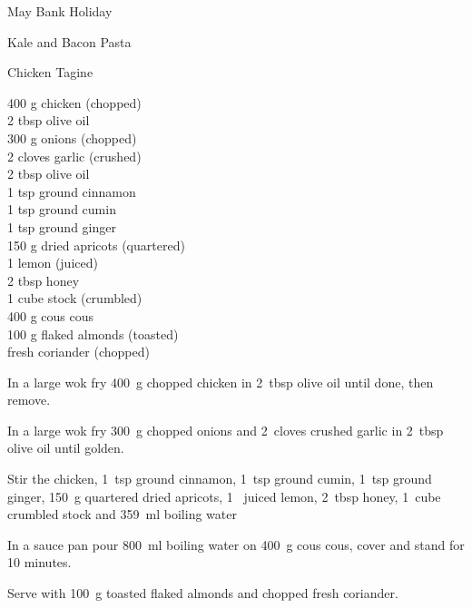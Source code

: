 \begin{menu}{May Bank Holiday}
\begin{recipe}{2}{Kale and Bacon Pasta}
\begin{instructions}
    \end{instructions}
    \end{recipe}%
  
    \begin{recipe}{2}{Chicken Tagine}%
    
		\begin{ingredients}
		400 g chicken (chopped) \\
	2 tbsp olive oil  \\
	300 g onions (chopped) \\
	2 cloves garlic (crushed) \\
	2 tbsp olive oil  \\
	1 tsp ground cinnamon  \\
	1 tsp ground cumin  \\
	1 tsp ground ginger  \\
	150 g dried apricots (quartered) \\
	1  lemon (juiced) \\
	2 tbsp honey  \\
	1 cube stock (crumbled) \\
	400 g cous cous  \\
	100 g flaked almonds (toasted) \\
	  fresh coriander (chopped) \\
	
		\end{ingredients}
	
    \begin{instructions}
    \item 
        In a large wok fry
        400~g chopped chicken
        in
        2~tbsp  olive oil
        until done, then remove.
      \item 
        In a large wok fry
        300~g chopped onions
        and
        2~cloves crushed garlic
        in
        2~tbsp  olive oil
        until golden.
      \item 
        Stir the chicken,
        1~tsp  ground cinnamon,
        1~tsp  ground cumin,
        1~tsp  ground ginger,
        150~g quartered dried apricots,
        1~ juiced lemon,
        2~tbsp  honey,
        1~cube crumbled stock
        and
        359~ml  boiling water\item 
      In a
      sauce pan pour 800~ml  boiling water
      on 400~g  cous cous, cover and
      stand for 10 minutes.
    \item 
        Serve with
        100~g toasted flaked almonds
        and
         chopped fresh coriander.
      
    \end{instructions}
    \end{recipe}%
  
    \clearpage
    \end{menu}
	
	
